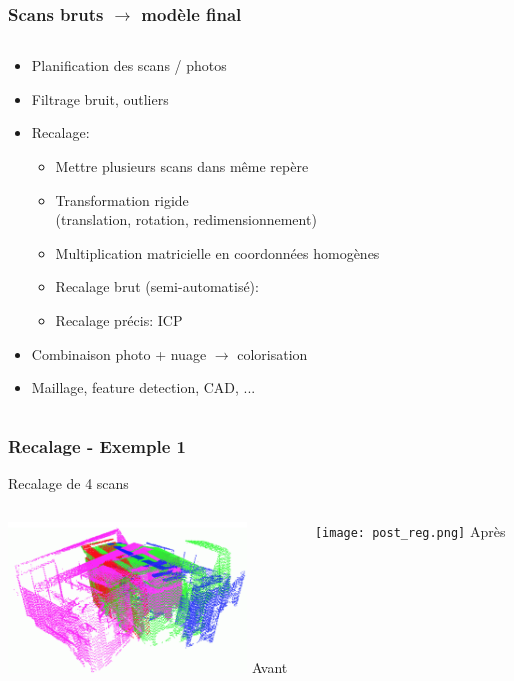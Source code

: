\documentclass{beamer}
\begin{document}
\begin{frame}
\frametitle{Scans bruts $\rightarrow$ modèle final}
	\begin{columns}
	\begin{column}[T]{.7\textwidth}
		\begin{itemize}
		\item Planification des scans / photos
		\item Filtrage bruit, outliers
		\item Recalage:
			\begin{itemize}
				\item Mettre plusieurs scans dans même repère
				\item Transformation rigide \\
					(translation, rotation, redimensionnement)
				\item Multiplication matricielle en coordonnées homogènes
				\item Recalage brut (semi-automatisé):
				\item Recalage précis: ICP
			\end{itemize}
		\item Combinaison photo + nuage $\rightarrow$ colorisation
		\item Maillage, feature detection, CAD, ...
		\end{itemize}
	\end{column}
	\begin{column}[T]{.3\textwidth}

	\end{column}
	\end{columns}
\end{frame}

\begin{frame}
\frametitle{Recalage - Exemple 1}
	\center Recalage de 4 scans \footnotesize{\cite{Maka2006}}
	\vspace{5mm}
	\begin{columns}
	\begin{column}[T]{.5\textwidth}
		\includegraphics[height=4cm]{pre_reg.png}
		\center \Large{Avant}
	\end{column}
	\begin{column}[T]{.5\textwidth}
		\texttt{[image: post\_reg.png]}
		\center \Large{Après}
	\end{column}
	\end{columns}
\end{frame}
\end{document}
